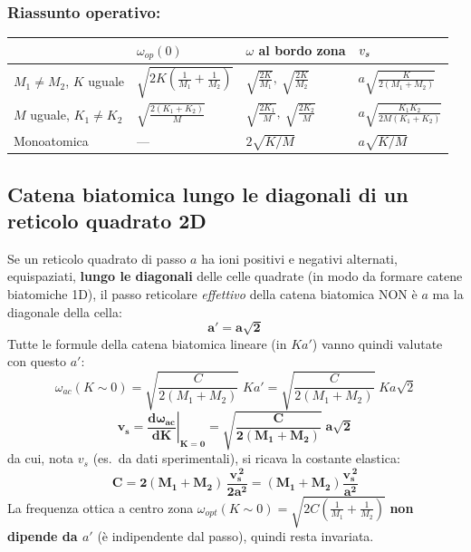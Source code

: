 \subsubsection*{Riassunto operativo:}
\begin{center}
\renewcommand{\arraystretch}{1.6}
\begin{tabular}{l l l l}
\toprule
& $\omega_{op}(0)$ & $\omega$ al bordo zona & $v_s$ \\
\midrule
$M_1\neq M_2$, $K$ uguale & $\sqrt{2K\left(\frac{1}{M_1}+\frac{1}{M_2}\right)}$ & $\sqrt{\frac{2K}{M_1}},\ \sqrt{\frac{2K}{M_2}}$ & $a\sqrt{\frac{K}{2(M_1+M_2)}}$ \\
$M$ uguale, $K_1\neq K_2$ & $\sqrt{\frac{2(K_1+K_2)}{M}}$ & $\sqrt{\frac{2K_1}{M}},\ \sqrt{\frac{2K_2}{M}}$ & $a\sqrt{\frac{K_1K_2}{2M(K_1+K_2)}}$ \\
Monoatomica & --- & $2\sqrt{K/M}$ & $a\sqrt{K/M}$ \\
\bottomrule
\end{tabular}
\end{center}

\subsection{Catena biatomica lungo le diagonali di un reticolo quadrato 2D}
Se un reticolo quadrato di passo $a$ ha ioni positivi e negativi alternati,
equispaziati, \textbf{lungo le diagonali} delle celle quadrate (in modo da formare
catene biatomiche 1D), il passo reticolare \emph{effettivo} della catena biatomica
NON è $a$ ma la diagonale della cella:
\[ \bm{a' = a\sqrt{2}} \]
Tutte le formule della catena biatomica lineare (in $K a'$) vanno quindi valutate con
questo $a'$:
\[ \omega_{ac}(K\sim0) = \sqrt{\frac{C}{2(M_1+M_2)}}\;K a' = \sqrt{\frac{C}{2(M_1+M_2)}}\;K a\sqrt2 \]
\[ \bm{v_s = \left.\frac{d\omega_{ac}}{dK}\right|_{K=0} = \sqrt{\frac{C}{2(M_1+M_2)}}\;a\sqrt2} \]
da cui, nota $v_s$ (es.\ da dati sperimentali), si ricava la costante elastica:
\[ \bm{C = 2(M_1+M_2)\,\frac{v_s^{\,2}}{2a^2} = (M_1+M_2)\frac{v_s^{\,2}}{a^2}} \]
La frequenza ottica a centro zona $\omega_{opt}(K\sim0)=\sqrt{2C\!\left(\frac1{M_1}+\frac1{M_2}\right)}$
\textbf{non dipende da $a'$} (è indipendente dal passo), quindi resta invariata.


